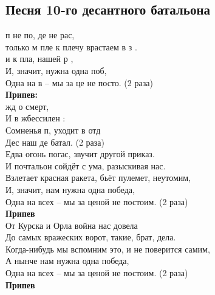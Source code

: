 \documentclass[fleqn,a5paper,12pt,twoside]{guitartabs}
\newcommand{\musVspace}{\vspace{2mm}}
\begin{document}
\subsection*{Песня 10-го десантного батальона}
     п не по, де не рас,\\
     только м пле к плечу врастаем в з .\\
     и к пла,  нашей р ,\\
    И, значит,  нужна одна поб,\\                   
    Одна на в -- мы за це не посто. (2 раза)\musVspace\\
    \-\hspace{10mm}\textbf{Припев:}\\
    \-\hspace{10mm} жд о смерт,\\
    \-\hspace{10mm}И в ж\E{ }бессилен :\\
    \-\hspace{10mm}Сомненья п, уходит в  отд\\
    \-\hspace{10mm}Дес наш де батал. (2 раза)\musVspace\\
    Едва огонь погас, звучит другой приказ.\\
    И почтальон сойдёт с ума, разыскивая нас.\\
    Взлетает красная ракета, бьёт пулемет, неутомим,\\
    И, значит, нам нужна одна победа, \\
    Одна на всех -- мы за ценой не постоим. (2 раза) \musVspace\\
    \musVspace
    \-\hspace{10mm}\textbf{Припев}\\
    От Курска и Орла война нас довела\\
    До самых вражеских ворот, такие, брат, дела.\\
    Когда-нибудь мы вспомним это, и не поверится самим,\\
    А нынче нам нужна одна победа, \\
    Одна на всех -- мы за ценой не постоим. (2 раза)\musVspace\\
    \-\hspace{10mm}\textbf{Припев}
\newpage
\end{document}
